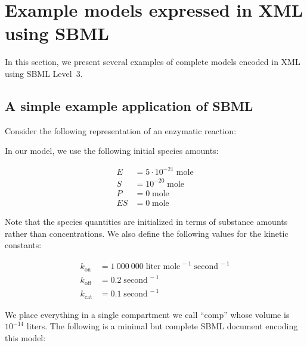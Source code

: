 

\newcommand{\species}[1]{\ensuremath{#1}\xspace}
\newcommand{\concent}[1]{\ensuremath{[#1\mkern1mu]}\xspace}
\newcommand{\unit}[1]   {\text{#1}\xspace}


\section{Example models expressed in XML using SBML}
\label{sec:xml-rep}
\label{sec:examples}

In this section, we present several examples of complete models
encoded in XML using SBML Level~3.


\subsection{A simple example application of SBML}
\label{sec:modeleg}

\newcommand{\kon} {\ensuremath{k_\text{on}}\xspace}
\newcommand{\koff}{\ensuremath{k_\text{off}}\xspace}
\newcommand{\kcat}{\ensuremath{k_\text{cat}}\xspace}

Consider the following representation of an enzymatic reaction:
\begin{center}
  \ce{\species{E} + \species{S} <=>[\kon][\koff] \species{ES} ->[\kcat] \species{E} + \species{P}}
\end{center}
In our model, we use the following initial species amounts:
\begin{linenomath}
  \begin{align*}
    \species{E}  &= 5 \cdot 10^{-21}\; \unit{mole} \\
    \species{S}  &= 10^{-20}\; \unit{mole} \\
    \species{P}  &= 0\; \unit{mole} \\
    \species{ES} &= 0\; \unit{mole}
  \end{align*}
\end{linenomath}
Note that the species quantities are initialized in terms of
substance amounts rather than concentrations.  We also define the
following values for the kinetic constants:
\begin{linenomath}
  \begin{align*}
    \kon         &= 1\:000\:000 \; \unit{liter} \; \unit{mole}^{\,-1} \; \unit{second}^{\,-1}\\
    \koff        &= 0.2 \; \unit{second}^{\,-1}\\
    \kcat        &= 0.1 \; \unit{second}^{\,-1}
  \end{align*}
\end{linenomath}
We place everything in a single compartment we call ``comp'' whose
volume is $10^{-14}$ liters.  The following is a minimal but
complete SBML document encoding this model:

